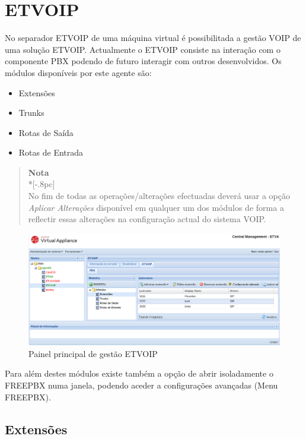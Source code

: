 \section{ETVOIP}
No separador ETVOIP de uma máquina virtual é possibilitada a gestão VOIP de uma solução ETVOIP.
Actualmente o ETVOIP consiste na interação com o componente PBX podendo de futuro interagir com outros desenvolvidos.
Os módulos disponíveis por este agente são:
\begin{itemize}
    \item Extensões
    \item Trunks
    \item Rotas de Saída
    \item Rotas de Entrada
\end{itemize}


\begin{quote}
	{\large \bf Nota} \\*[-.8pc]
	\underline{\hspace{6in}} \\
    No fim de todas as operações/alterações efectuadas deverá usar a opção \emph{Aplicar Alterações} disponível em qualquer um dos módulos de forma a reflectir essas alterações na configuração actual do sistema VOIP.
\end{quote}


\begin{figure}[H]
        \begin{center}
        \includegraphics[scale=0.4]{screenshots/etvoip_pbx.png}
        \caption{Painel principal de gestão ETVOIP}
        \label{fig:etvoip_pbx}
        \end{center}
\end{figure}

Para além destes módulos existe também a opção de abrir isoladamente o FREEPBX numa janela, podendo aceder a configurações avançadas (Menu FREEPBX).


\subsection{Extensões}

